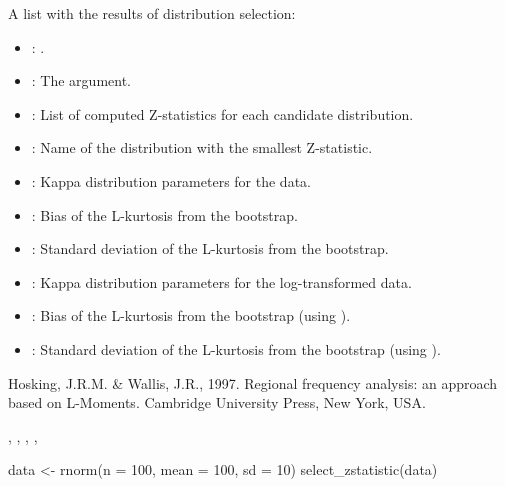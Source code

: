 \documentclass[a4paper]{book}
\begin{document}
%
\begin{Value}
A list with the results of distribution selection:
\begin{itemize}

\item{} : .
\item{} : The  argument.
\item{} : List of computed Z-statistics for each candidate distribution.
\item{} : Name of the distribution with the smallest Z-statistic.
\item{} : Kappa distribution parameters for the data.
\item{} : Bias of the L-kurtosis from the bootstrap.
\item{} : Standard deviation of the L-kurtosis from the bootstrap.
\item{} : Kappa distribution parameters for the log-transformed data.
\item{} : Bias of the L-kurtosis from the bootstrap (using ).
\item{} : Standard deviation of the L-kurtosis from the bootstrap (using ).

\end{itemize}

\end{Value}
%
\begin{References}
Hosking, J.R.M. \& Wallis, J.R., 1997. Regional frequency analysis: an approach based
on L-Moments. Cambridge University Press, New York, USA.
\end{References}
%
\begin{SeeAlso}
, , ,
, 
\end{SeeAlso}
%
\begin{Examples}
\begin{ExampleCode}
data <- rnorm(n = 100, mean = 100, sd = 10)
select_zstatistic(data)

\end{ExampleCode}
\end{Examples}
\end{document}
